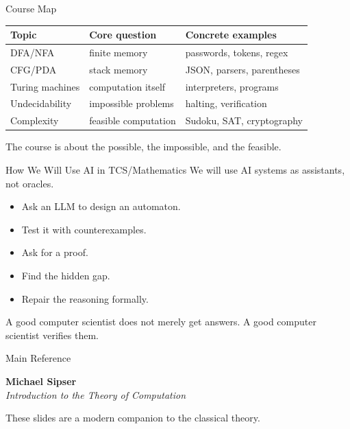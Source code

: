 \documentclass[10pt,aspectratio=169]{beamer}
\newcommand{\tagline}[1]{\begin{center}\alert{#1}\end{center}}
\begin{document}
\begin{frame}{Course Map}
\begin{center}
\begin{tabular}{lll}
\toprule
\textbf{Topic} & \textbf{Core question} & \textbf{Concrete examples} \\
\midrule
DFA/NFA & finite memory & passwords, tokens, regex \\
CFG/PDA & stack memory & JSON, parsers, parentheses \\
Turing machines & computation itself & interpreters, programs \\
Undecidability & impossible problems & halting, verification \\
Complexity & feasible computation & Sudoku, SAT, cryptography \\
\bottomrule
\end{tabular}
\end{center}

\pause
\vspace{1em}
\tagline{The course is about the possible, the impossible, and the feasible.}
\end{frame}

\begin{frame}{How We Will Use AI in TCS/Mathematics}
We will use AI systems as assistants, not oracles.

\pause
\begin{itemize}
    \item Ask an LLM to design an automaton.
    \item Test it with counterexamples.
    \item Ask for a proof.
    \item Find the hidden gap.
    \item Repair the reasoning formally.
\end{itemize}

\pause
\vspace{1em}
\tagline{A good computer scientist does not merely get answers. A good computer scientist verifies them.}
\end{frame}

\begin{frame}{Main Reference}
\begin{center}
\Large
\textbf{Michael Sipser}\\[0.3em]
\emph{Introduction to the Theory of Computation}
\end{center}

\pause
\vspace{1.5em}
\begin{center}
These slides are a modern companion to the classical theory.
\end{center}
\end{frame}
\end{document}
